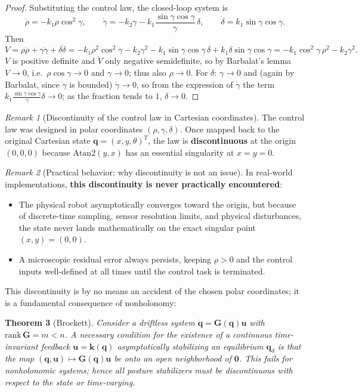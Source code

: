 \documentclass[11pt,a4paper]{article}
\theoremstyle{plain}
\newtheorem{theorem}{Theorem}[section]
\theoremstyle{definition}
\theoremstyle{remark}
\newtheorem{remark}[theorem]{Remark}
\begin{document}
\begin{proof}
Substituting the control law, the closed-loop system is
\[
\dot\rho=-k_1\rho\cos^2\!\gamma,\qquad
\dot\gamma=-k_2\gamma-k_1\frac{\sin\gamma\cos\gamma}{\gamma}\,\delta,\qquad
\dot\delta=k_1\sin\gamma\cos\gamma .
\]
Then
\[
\dot V=\rho\dot\rho+\gamma\dot\gamma+\delta\dot\delta=-k_1\rho^2\cos^2\!\gamma-k_2\gamma^2-k_1\sin\gamma\cos\gamma\,\delta+k_1\delta\sin\gamma\cos\gamma=-k_1\cos^2\!\gamma\,\rho^2-k_2\gamma^2 .
\]
$V$ is positive definite and $\dot V$ only negative semidefinite, so by Barbalat's lemma $\dot V\to0$, i.e.\ $\rho\cos\gamma\to0$ and $\gamma\to0$; thus also $\rho\to0$. For $\delta$: $\gamma\to0$ and (again by Barbalat, since $\ddot\gamma$ is bounded) $\dot\gamma\to0$, so from the expression of $\dot\gamma$ the term $k_1\frac{\sin\gamma\cos\gamma}{\gamma}\delta\to0$; as the fraction tends to $1$, $\delta\to0$.
\end{proof}

\begin{remark}[Discontinuity of the control law in Cartesian coordinates]
The control law was designed in polar coordinates $(\rho,\gamma,\delta)$. Once mapped back to the original Cartesian state $\bm q=(x,y,\theta)^T$, the law is \textbf{discontinuous} at the origin $(0,0,0)$ because $\mathrm{Atan2}(y,x)$ has an essential singularity at $x=y=0$.
\end{remark}

\begin{remark}[Practical behavior: why discontinuity is not an issue]
In real-world implementations, \textbf{this discontinuity is never practically encountered}:
\begin{itemize}[leftmargin=*,nosep]
\item The physical robot asymptotically converges toward the origin, but because of discrete-time sampling, sensor resolution limits, and physical disturbances, the state never lands mathematically on the exact singular point $(x,y)=(0,0)$.
\item A microscopic residual error always persists, keeping $\rho>0$ and the control inputs well-defined at all times until the control task is terminated.
\end{itemize}
\end{remark}

This discontinuity is by no means an accident of the chosen polar coordinates; it is a fundamental consequence of nonholonomy:

\begin{theorem}[Brockett]\label{thm:brockett}
Consider a driftless system $\dot{\bm q}=\bm G(\bm q)\bm u$ with $\mathrm{rank}\,\bm G=m<n$. A necessary condition for the existence of a continuous time-invariant feedback $\bm u=\bm k(\bm q)$ asymptotically stabilizing an equilibrium $\bm q_d$ is that the map $(\bm q,\bm u)\mapsto\bm G(\bm q)\bm u$ be onto an open neighborhood of $\bm 0$. This fails for nonholonomic systems; hence all posture stabilizers must be \emph{discontinuous with respect to the state} or \emph{time-varying}.
\end{theorem}
\end{document}

